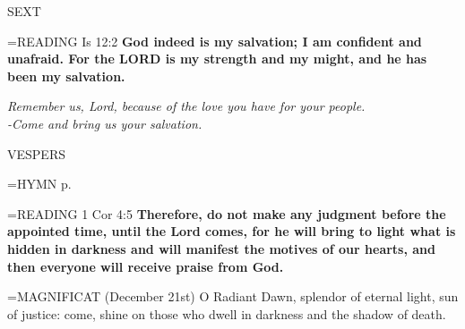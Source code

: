 \begin{flushleft}\normalsize SEXT\\\end{flushleft}

\hangindent=\parindent \small{READING} Is 12:2 \textbf{God indeed is my salvation; I am confident and unafraid. For the LORD is my strength and my might, and he has been my salvation.}

\begin{center}
\textit{Remember us, Lord, because of the love you have for your people.\\
-Come and bring us your salvation.}
\end{center}

\begin{flushleft}\normalsize VESPERS\\\end{flushleft}

\hangindent=\parindent \small{\uppercase{HYMN} p.  \pageref{advent:firstHymn}\\}

\hangindent=\parindent \small{READING} 1 Cor 4:5 \textbf{Therefore, do not make any judgment before the appointed time, until the Lord comes, for he will bring to light what is hidden in darkness and will manifest the motives of our hearts, and then everyone will receive praise from God.\\}

\hangindent=\parindent \small{MAGNIFICAT  (December 21st) O Radiant Dawn, splendor of eternal light, sun of justice: come, shine on those who dwell in darkness and the shadow of death.\\}
